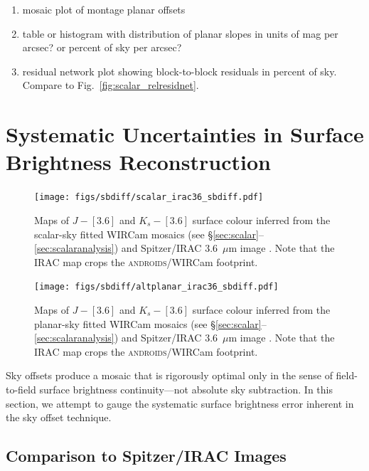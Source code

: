 \documentclass[iop]{emulateapj}
\newcommand{\androids}{\textsc{androids}}
\newcommand{\todo}[1]{\textcolor{RedOrange}{#1}} %
\newcommand{\Fig}[1]{Fig.~\ref{fig:#1}}  %
\begin{document}
\todo{\begin{enumerate}
    \item mosaic plot of montage planar offsets
    \item table or histogram with distribution of planar slopes in units of mag per arcsec? or percent of sky per arcsec?
    \item residual network plot showing block-to-block residuals in percent of sky. Compare to \Fig{scalar_relresidnet}.
\end{enumerate}
}

\section{Systematic Uncertainties in Surface Brightness Reconstruction}
\label{sec:systematics}

\begin{figure}[t]
    \centering
        \texttt{[image: figs/sbdiff/scalar\_irac36\_sbdiff.pdf]}
    \caption{Maps of $J-[3.6]$ and $K_s-[3.6]$ surface colour inferred from the scalar-sky fitted WIRCam mosaics (see \S\ref{sec:scalar}--\ref{sec:scalaranalysis}) and Spitzer/IRAC 3.6~$\mu$m image \citep{Barmby:2006}. Note that the IRAC map crops the \androids/WIRCam footprint.}
    \label{fig:scalar_irac36_sbdiff}
\end{figure}

\begin{figure}[t]
    \centering
        \texttt{[image: figs/sbdiff/altplanar\_irac36\_sbdiff.pdf]}
    \caption{Maps of $J-[3.6]$ and $K_s-[3.6]$ surface colour inferred from the planar-sky fitted WIRCam mosaics (see \S\ref{sec:scalar}--\ref{sec:scalaranalysis}) and Spitzer/IRAC 3.6~$\mu$m image \citep{Barmby:2006}. Note that the IRAC map crops the \androids/WIRCam footprint.}
    \label{fig:altplanar_irac36_sbdiff}
\end{figure}

Sky offsets produce a mosaic that is rigorously optimal only in the sense of field-to-field surface brightness continuity---not absolute sky subtraction. In this section, we attempt to gauge the systematic surface brightness error inherent in the sky offset technique.

\subsection{Comparison to Spitzer/IRAC Images}
\end{document}
